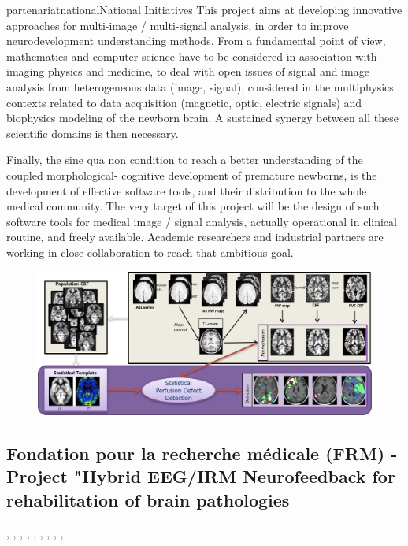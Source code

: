 \documentclass{ra2018}
\begin{document}
\begin{module}{partenariat}{national}{National Initiatives}
        This project aims at developing innovative approaches for multi-image /
        multi-signal analysis, in order to improve neurodevelopment understanding
        methods. From a fundamental point of view, mathematics and computer science
        have to be considered in association with imaging physics and medicine, to deal
        with open issues of signal and image analysis from heterogeneous data (image,
        signal), considered in the multiphysics contexts related to data acquisition
        (magnetic, optic, electric signals) and biophysics modeling of the newborn
        brain. A sustained synergy between all these scientific domains is then
        necessary.
        
        Finally, the sine qua non condition to reach a better understanding of the
        coupled morphological- cognitive development of premature newborns, is the
        development of effective software tools, and their distribution to the whole
        medical community. The very target of this project will be the design of such
        software tools for medical image / signal analysis, actually operational in
        clinical routine, and freely available. Academic researchers and industrial
        partners are working in close collaboration to reach that ambitious goal.


        \begin{figure}[htbp]
          \centerline{
            \includegraphics[width=\textwidth]{IMG/ASL_quantification}
          }
        \end{figure}
        
         \subsection{Fondation pour la recherche médicale (FRM) - Project "Hybrid EEG/IRM Neurofeedback for  rehabilitation of brain pathologies}
        \begin{participants}
        	, 
        	,
        	, 
        	,
        	, 
        	, 
        	, 
        	,
        	, 
        \end{participants}	
        

\end{module}
\end{document}
